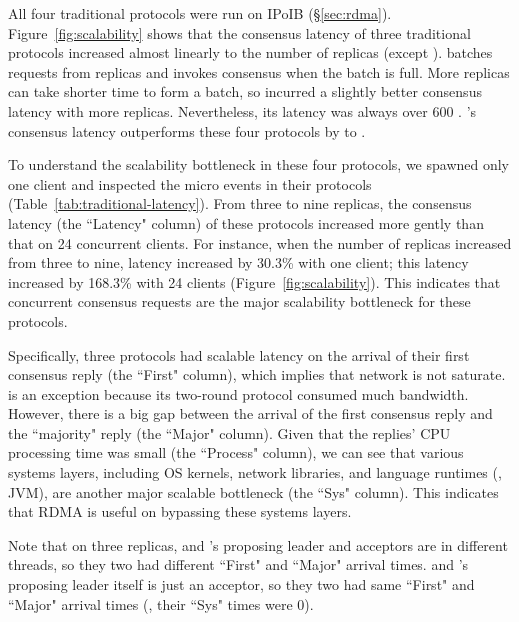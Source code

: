 All four traditional protocols were run on IPoIB (\S\ref{sec:rdma}). 
Figure~\ref{fig:scalability} shows that the consensus latency of three 
traditional protocols increased almost linearly to the number of replicas 
(except \spaxos). \spaxos batches requests from replicas and invokes consensus 
when the batch is full. More replicas can take shorter time to form a batch, so 
\spaxos incurred a slightly better consensus latency with more replicas. 
Nevertheless, its latency was always over 600 \us. \xxx's consensus latency 
outperforms these four protocols by \comptradlow to \comptradhigh.



To understand the scalability bottleneck in these four protocols, we spawned 
only one client and inspected the micro events in their protocols 
(Table~\ref{tab:traditional-latency}). From three to nine replicas, the 
consensus latency (the ``Latency" column) of these protocols increased more 
gently than that on 24 concurrent clients. For instance, when the number of 
replicas increased from three to nine, \zookeeper latency increased by 30.3\% 
with one client; this latency increased by 168.3\% with 24 clients 
(Figure~\ref{fig:scalability}). This indicates that concurrent consensus 
requests are the major scalability bottleneck for these protocols.

Specifically, three protocols had scalable latency on the arrival of their 
first consensus reply (the ``First" column), which implies that network is not 
saturate. \libpaxos is an exception because its two-round protocol consumed 
much bandwidth. However, there is a big gap between the arrival of the first 
consensus reply and the ``majority" reply (the ``Major" column). Given that the 
replies' CPU processing time was small (the ``Process" column), we can see that 
various systems layers, including OS kernels, network libraries, and 
language runtimes (\eg, JVM), are another major scalable bottleneck (the ``Sys" 
column). This indicates that RDMA is useful on bypassing these systems layers.

Note that on three replicas, \libpaxos and \crane's proposing 
leader and acceptors are in different threads, so they two had different 
``First" and ``Major" arrival times. \crane and \spaxos's proposing 
leader itself is just an acceptor, so they two had same ``First" and ``Major" 
arrival times (\ie, their ``Sys" times were 0).

